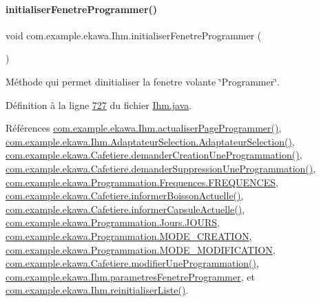 \paragraph{\texorpdfstring{initialiser\+Fenetre\+Programmer()}{initialiserFenetreProgrammer()}}
{\footnotesize\ttfamily void com.\+example.\+ekawa.\+Ihm.\+initialiser\+Fenetre\+Programmer (\begin{DoxyParamCaption}{ }\end{DoxyParamCaption})\hspace{0.3cm}{\ttfamily [private]}}



Méthode qui permet d\textquotesingle{}initialiser la fenetre volante \char`\"{}\+Programmer\char`\"{}. 



Définition à la ligne \hyperlink{_ihm_8java_source_l00727}{727} du fichier \hyperlink{_ihm_8java_source}{Ihm.\+java}.



Références \hyperlink{_ihm_8java_source_l00938}{com.\+example.\+ekawa.\+Ihm.\+actualiser\+Page\+Programmer()}, \hyperlink{_ihm_8java_source_l00156}{com.\+example.\+ekawa.\+Ihm.\+Adaptateur\+Selection.\+Adaptateur\+Selection()}, \hyperlink{_cafetiere_8java_source_l00720}{com.\+example.\+ekawa.\+Cafetiere.\+demander\+Creation\+Une\+Programmation()}, \hyperlink{_cafetiere_8java_source_l00793}{com.\+example.\+ekawa.\+Cafetiere.\+demander\+Suppression\+Une\+Programmation()}, \hyperlink{_programmation_8java_source_l00067}{com.\+example.\+ekawa.\+Programmation.\+Frequences.\+F\+R\+E\+Q\+U\+E\+N\+C\+ES}, \hyperlink{_cafetiere_8java_source_l00245}{com.\+example.\+ekawa.\+Cafetiere.\+informer\+Boisson\+Actuelle()}, \hyperlink{_cafetiere_8java_source_l00235}{com.\+example.\+ekawa.\+Cafetiere.\+informer\+Capsule\+Actuelle()}, \hyperlink{_programmation_8java_source_l00047}{com.\+example.\+ekawa.\+Programmation.\+Jours.\+J\+O\+U\+RS}, \hyperlink{_programmation_8java_source_l00033}{com.\+example.\+ekawa.\+Programmation.\+M\+O\+D\+E\+\_\+\+C\+R\+E\+A\+T\+I\+ON}, \hyperlink{_programmation_8java_source_l00034}{com.\+example.\+ekawa.\+Programmation.\+M\+O\+D\+E\+\_\+\+M\+O\+D\+I\+F\+I\+C\+A\+T\+I\+ON}, \hyperlink{_cafetiere_8java_source_l00775}{com.\+example.\+ekawa.\+Cafetiere.\+modifier\+Une\+Programmation()}, \hyperlink{_ihm_8java_source_l00137}{com.\+example.\+ekawa.\+Ihm.\+parametres\+Fenetre\+Programmer}, et \hyperlink{_ihm_8java_source_l00974}{com.\+example.\+ekawa.\+Ihm.\+reinitialiser\+Liste()}.



